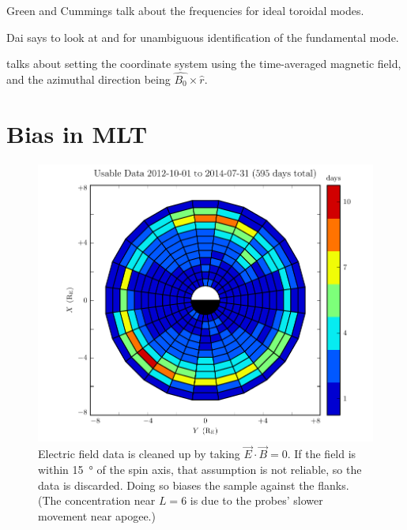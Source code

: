 Green\cite{green_1979} and Cummings\cite{cummings_1969} talk about the frequencies for ideal toroidal modes. 

Dai\cite{dai_2015} says to look at \cite{takahashi_2011} and \cite{dai_2013} for unambiguous identification of the fundamental mode. 

\cite{liu_2010} talks about setting the coordinate system using the time-averaged magnetic field, and the azimuthal direction being $\hat{B_0} \times \hat{r}$. 

\section{Bias in MLT}



\begin{figure}[!htb]
    \centering
    \includegraphics[width=\textwidth]{figures/pos.pdf}
    \caption[Spatial Distribution of Usable Van Allen Probe Data]{
      Electric field data is cleaned up by taking $\vec{E} \cdot \vec{B} = 0$. If the field is within \SI{15}{\degree} of the spin axis, that assumption is not reliable, so the data is discarded. Doing so biases the sample against the flanks. (The concentration near $L=6$ is due to the probes' slower movement near apogee.)
    }
    \label{fig_pos}
\end{figure}



